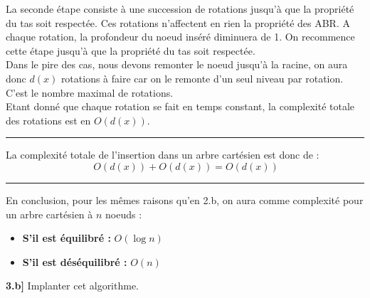 \documentclass[a4paper,12pt]{report}
\begin{document}
\begin{tcolorbox}[colback=gray!10, colframe=blue!30, coltitle=black, title=Réponse à la 3.b - 2/2]

    La seconde étape consiste à une succession de rotations jusqu'à que la propriété du tas soit respectée. Ces rotations n'affectent en rien la propriété des ABR. A chaque rotation, la profondeur du noeud inséré diminuera de 1. On recommence cette étape jusqu'à que la propriété du tas soit respectée.\\

    Dans le pire des cas, nous devons remonter le noeud jusqu'à la racine, on aura donc \( d(x) \) rotations à faire car on le remonte d'un seul niveau par rotation. C'est le nombre maximal de rotations.\\

    Etant donné que chaque rotation se fait en temps constant, la complexité totale des rotations est en \( O(d(x)) \).\\[-0.4cm]

    \vspace{0.5cm}
    \hrule
    \vspace{0.5cm}

    La complexité totale de l'insertion dans un arbre cartésien est donc de :
    \[
    \ O(d(x)) + O(d(x)) = O(d(x))
    \]

    \vspace{0.5cm}
    \hrule
    \vspace{0.5cm}

    En conclusion, pour les mêmes raisons qu'en 2.b, on aura comme complexité pour un arbre cartésien à \( n \) noeuds :
    \begin{itemize}
        \item \textbf{S'il est équilibré :} \( O(\log n) \)
        \item \textbf{S'il est déséquilibré :} \( O(n) \)
    \end{itemize}

\end{tcolorbox}




\newpage
{}

\textbf{3.b]} Implanter cet algorithme.
\end{document}
